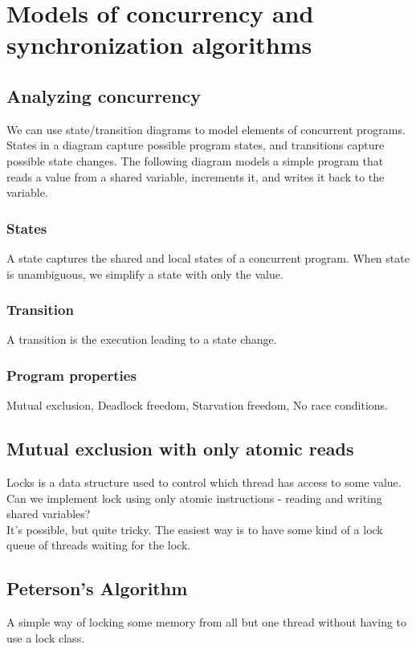 \chapter{Models of concurrency and synchronization algorithms}
\section{Analyzing concurrency}
We can use state/transition diagrams to model elements of concurrent programs. States in a diagram capture possible program states, and transitions capture possible state changes. The following diagram models a simple program that reads a value from a shared variable, increments it, and writes it back to the variable.
\subsection{States}
A state captures the shared and local states of a concurrent program. When state is unambiguous, we simplify a state with only the value.
\subsection{Transition}
A transition is the execution leading to a state change.
\subsection{Program properties}
Mutual exclusion, Deadlock freedom, Starvation freedom, No race conditions.
\section{Mutual exclusion with only atomic reads}
Locks is a data structure used to control which thread has access to some value.\\
Can we implement lock using only atomic instructions - reading and writing shared variables?\\
\indent It's possible, but quite tricky. The easiest way is to have some kind of a lock queue of threads waiting for the lock.\\
\pagebreak
\section{Peterson's Algorithm}
A simple way of locking some memory from all but one thread without having to use a lock class.
